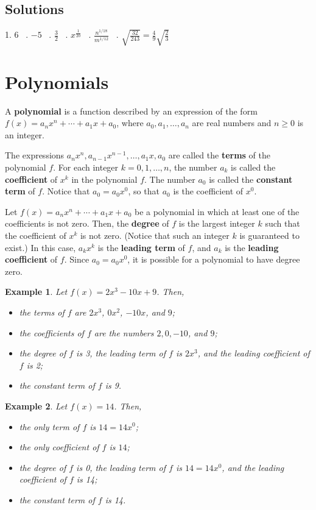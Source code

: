 \documentclass[11pt]{book}               %
\newtheorem{example}{Example}
\begin{document}
\subsection{Solutions} 
1.  $6 $ \  .  $ -5 $ \ .  $ \frac{3}{2} $ \  .  $ x^\frac{1}{20} $ \ . $\displaystyle\frac{ n^{1/18}} {  m^{1/12}} $ \ . $ \sqrt{\frac{32}{243}}  = \frac{4}{9}\sqrt{\frac{2}{3}} $

\newpage
\section{Polynomials}

A \textbf{polynomial} is a function 
described by an expression of the form $f(x)=a_nx^n + \cdots + a_1x+a_0$, 
where $a_0, a_1,\ldots,a_n$ are real numbers and $n\geq0$ is an integer. 

The expressions $a_n x^n, a_{n-1}x^{n-1}, \ldots, a_1x, a_0$ are called the
\textbf{terms} of the polynomial $f$.
For each integer $k = 0, 1, \ldots, n$, the number $a_k$ is called the \textbf{coefficient} of $x^k$ in the polynomial $f$.
The number $a_0$ is called the \textbf{constant term} of $f$.
Notice that $a_0 = a_0 x^0$, so that $a_0$ is the coefficient of $x^0$.

Let $f(x) =a_nx^n + \cdots + a_1x+a_0$ be a polynomial in 
which at least one of the coefficients is not zero.
Then, the 
\textbf{degree} of $f$ is the largest integer $k$ such that the coefficient of $x^k$ is not zero.
(Notice that such an integer $k$ is guaranteed to exist.)
In this case, $a_kx^k$ is the \textbf{leading term} of $f$, and $a_k$ is the \textbf{leading coefficient} of $f$.
Since $a_0 = a_0 x^0$, it is possible for a polynomial to have degree zero.


\begin{example} Let  $f(x)=2x^3-10x+9$. Then,
\normalfont
\begin{itemize}
\item the terms of $f$ are $2x^3$, $0x^2$, $-10x$, and $9$;
\item the coefficients of $f$ are the numbers $2, 0, -10$, and $9$;
\item the degree of $f$ is 3, the leading term of $f$ is $2x^3$,  and the leading coefficient of $f$ is 2;
\item the constant term of $f$ is 9.
\end{itemize}
\end{example}

\begin{example} Let $f(x) = 14$.  Then,
\normalfont
\begin{itemize}
\item the only term of $f$ is $14 = 14x^0$;
\item the only coefficient of $f$ is $14$;
\item the degree of $f$ is 0, the leading term of $f$ is $14 = 14x^0$,  and the leading coefficient of $f$ is 14;
\item the constant term of $f$ is 14.
\end{itemize}
\end{example}
\end{document}
